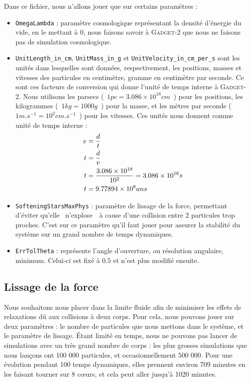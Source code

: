 	Dans ce fichier, nous n'allons jouer que sur certains paramètres :
	\begin{itemize}
		\item \verb|OmegaLambda| : paramètre cosmologique représentant la densité d'énergie du vide, en le mettant à 0, nous faisons savoir à \textsc{Gadget-2} que nous ne faisons pas de simulation cosmologique.
		\item \verb|UnitLength_in_cm|, \verb|UnitMass_in_g| et \verb|UnitVelocity_in_cm_per_s| sont les unités dans lesquelles sont données, respectivement, les positions, masses et vitesses des particules en
			centimètre, gramme en centimètre par seconde. Ce sont ces facteurs de conversion qui donne l'unité de temps interne à \textsc{Gadget-2}. Nous utilisons les parsecs (~$ 1 pc = 3.086 \times 10^{18} cm$~)
			pour les positions, les kilogrammes (~$1 kg = 1000 g$~) pour la masse, et les mètres par seconde (~$ 1 m.s^{-1} = 10^2 cm.s^{-1}$~) pour les vitesses. Ces unités nous donnent comme unité de temps
			interne :
			\begin{align}
				v &= \frac{d}{t} \notag \\
				t &= \frac{d}{v} \notag \\
				t &= \frac{3.086 \times 10^{18}}{10^2} = 3.086 \times 10^{16} s \notag \\
				t &= 9.77894 \times 10^8 ans
			\end{align}
		\item \verb|SofteningStarsMaxPhys| : paramètre de lissage de la force, permettant d'éviter qu'elle \og~n'explose~\fg~à cause d'une collision entre 2 particules trop proches.
			C'est sur ce paramètre qu'il faut jouer pour assurer la stabilité du système sur un grand nombre de temps dynamiques.
		\item \verb|ErrTolTheta| : représente l'angle d'ouverture, ou résolution angulaire, minimum. Celui-ci est fixé à $0.5$ et n'est plus modifié ensuite.
	\end{itemize}

\subsection{Lissage de la force}
	Nous souhaitons nous placer dans la limite fluide afin de minimiser les effets de relaxations dû aux collisions à deux corps. Pour cela, nous pouvons jouer sur deux paramètres : le nombre de particules que nous mettons dans
	le système, et le paramètre de lissage. Étant limité en temps, nous ne pouvons pas lancer de simulations avec un très grand nombre de corps : les plus grosses simulations que nous lançons ont 100 000 particules, et
	occasionnellement 500 000. Pour une évolution pendant 100 temps dynamiques, elles prennent environ 709 minutes en les faisant tourner sur 8 cœurs, et cela peut aller jusqu'à 1020 minutes.


